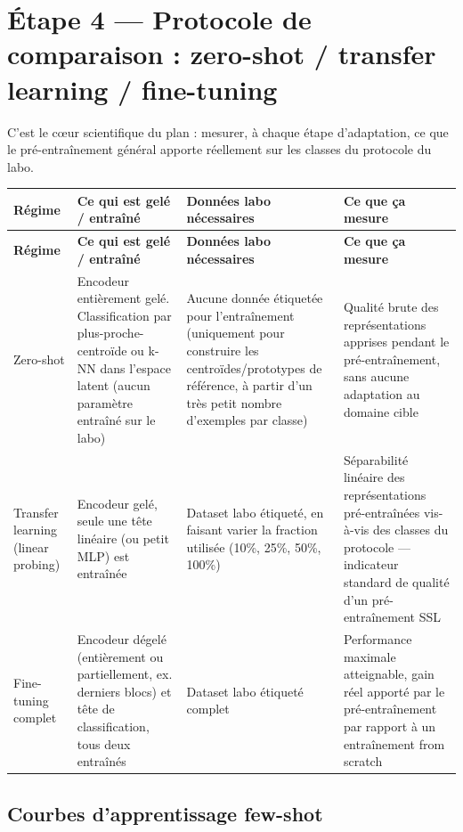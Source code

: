\documentclass[11pt]{article}
\begin{document}
\section{Étape 4 --- Protocole de comparaison : zero-shot / transfer learning / fine-tuning}

C'est le cœur scientifique du plan : mesurer, à chaque étape d'adaptation, ce que le
pré-entraînement général apporte réellement sur les classes du protocole du labo.

\begin{longtable}{P{2.6cm} P{4.5cm} P{4.5cm} P{2.5cm}}
\toprule
\textbf{Régime} & \textbf{Ce qui est gelé / entraîné} & \textbf{Données labo nécessaires} & \textbf{Ce que ça mesure} \\
\midrule
\endfirsthead
\toprule
\textbf{Régime} & \textbf{Ce qui est gelé / entraîné} & \textbf{Données labo nécessaires} & \textbf{Ce que ça mesure} \\
\midrule
\endhead

Zero-shot &
Encodeur entièrement gelé. Classification par plus-proche-centroïde ou k-NN dans l'espace
latent (aucun paramètre entraîné sur le labo) &
Aucune donnée étiquetée pour l'entraînement (uniquement pour construire les centroïdes/prototypes
de référence, à partir d'un très petit nombre d'exemples par classe) &
Qualité brute des représentations apprises pendant le pré-entraînement, sans aucune
adaptation au domaine cible \\
\addlinespace

Transfer learning (linear probing) &
Encodeur gelé, seule une tête linéaire (ou petit MLP) est entraînée &
Dataset labo étiqueté, en faisant varier la fraction utilisée (10\%, 25\%, 50\%, 100\%) &
Séparabilité linéaire des représentations pré-entraînées vis-à-vis des classes du
protocole --- indicateur standard de qualité d'un pré-entraînement SSL \\
\addlinespace

Fine-tuning complet &
Encodeur dégelé (entièrement ou partiellement, ex. derniers blocs) et tête de classification,
tous deux entraînés &
Dataset labo étiqueté complet &
Performance maximale atteignable, gain réel apporté par le pré-entraînement par rapport à un
entraînement from scratch \\

\bottomrule
\end{longtable}

\subsection{Courbes d'apprentissage few-shot}
\end{document}
